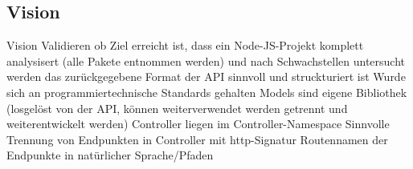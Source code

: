 \subsection{Vision} \label{subsec:Vision}
Vision
    Validieren ob Ziel erreicht ist, dass
        ein Node-JS-Projekt komplett analysisert (alle Pakete entnommen werden) und nach Schwachstellen untersucht werden
        das zurückgegebene Format der API sinnvoll und struckturiert ist
        Wurde sich an programmiertechnische Standards gehalten
            Models sind eigene Bibliothek (losgelöst von der API, können weiterverwendet werden getrennt und weiterentwickelt werden)
            Controller liegen im Controller-Namespace
            Sinnvolle Trennung von Endpunkten in Controller mit http-Signatur
            Routennamen der Endpunkte in natürlicher Sprache/Pfaden